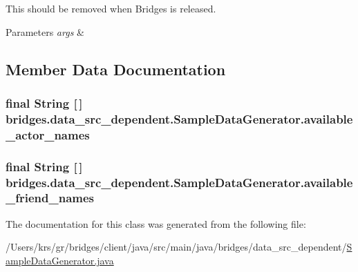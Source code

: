 This should be removed when Bridges is released. 
\begin{DoxyParams}{Parameters}
{\em args} & \\
\hline
\end{DoxyParams}


\subsection{Member Data Documentation}
\hypertarget{classbridges_1_1data__src__dependent_1_1_sample_data_generator_aac86cadaeb8859e94b6ed47a066cbbfc}{}
\subsubsection[{available\+\_\+actor\+\_\+names}]{\setlength{\rightskip}{0pt plus 5cm}final String \mbox{[}$\,$\mbox{]} bridges.\+data\+\_\+src\+\_\+dependent.\+Sample\+Data\+Generator.\+available\+\_\+actor\+\_\+names\hspace{0.3cm}{\ttfamily [static]}}\label{classbridges_1_1data__src__dependent_1_1_sample_data_generator_aac86cadaeb8859e94b6ed47a066cbbfc}
\hypertarget{classbridges_1_1data__src__dependent_1_1_sample_data_generator_a304c946018534a5a2b0049aace9d4472}{}
\subsubsection[{available\+\_\+friend\+\_\+names}]{\setlength{\rightskip}{0pt plus 5cm}final String \mbox{[}$\,$\mbox{]} bridges.\+data\+\_\+src\+\_\+dependent.\+Sample\+Data\+Generator.\+available\+\_\+friend\+\_\+names\hspace{0.3cm}{\ttfamily [static]}}\label{classbridges_1_1data__src__dependent_1_1_sample_data_generator_a304c946018534a5a2b0049aace9d4472}


The documentation for this class was generated from the following file\+:\begin{DoxyCompactItemize}
\item 
/\+Users/krs/gr/bridges/client/java/src/main/java/bridges/data\+\_\+src\+\_\+dependent/\hyperlink{_sample_data_generator_8java}{Sample\+Data\+Generator.\+java}\end{DoxyCompactItemize}
